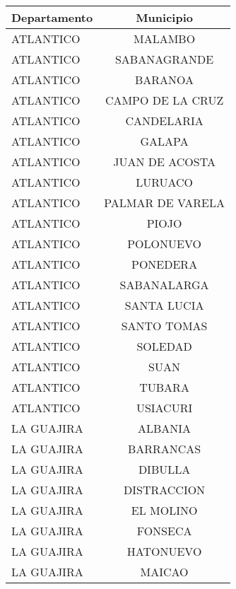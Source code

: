 \documentclass[12pt,a4paper]{article}
\begin{document}
\begin{longtable}{@{}lc@{}}
	\toprule
	\multicolumn{1}{c}{\textbf{Departamento}} & \textbf{Municipio}  \\ \midrule
		ATLANTICO             & MALAMBO              \\
		ATLANTICO             & SABANAGRANDE         \\
		ATLANTICO             & BARANOA              \\
		ATLANTICO             & CAMPO DE LA CRUZ     \\
		ATLANTICO             & CANDELARIA           \\
		ATLANTICO             & GALAPA               \\
		ATLANTICO             & JUAN DE ACOSTA       \\
		ATLANTICO             & LURUACO              \\
		ATLANTICO             & PALMAR DE VARELA     \\
		ATLANTICO             & PIOJO                \\
		ATLANTICO             & POLONUEVO            \\
		ATLANTICO             & PONEDERA             \\
		ATLANTICO             & SABANALARGA          \\
		ATLANTICO             & SANTA LUCIA          \\
		ATLANTICO             & SANTO TOMAS          \\
		ATLANTICO             & SOLEDAD              \\
		ATLANTICO             & SUAN                 \\
		ATLANTICO             & TUBARA               \\
		ATLANTICO             & USIACURI             \\
		LA GUAJIRA            & ALBANIA              \\
		LA GUAJIRA            & BARRANCAS            \\
		LA GUAJIRA            & DIBULLA              \\
		LA GUAJIRA            & DISTRACCION          \\
		LA GUAJIRA            & EL MOLINO            \\
		LA GUAJIRA            & FONSECA              \\
		LA GUAJIRA            & HATONUEVO            \\
		LA GUAJIRA            & MAICAO               \\

\end{longtable}
\end{document}
